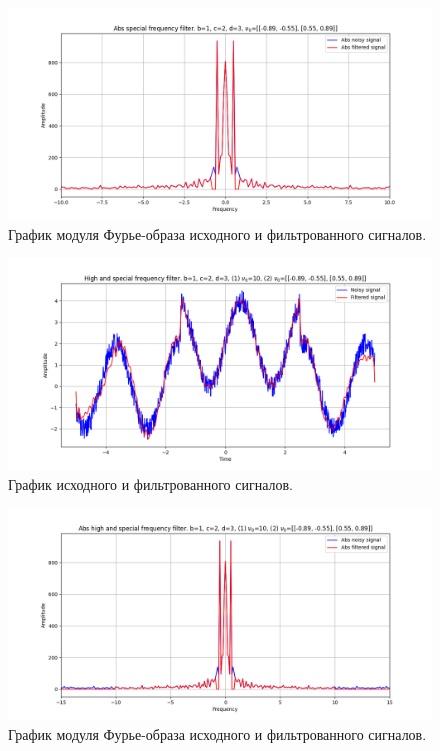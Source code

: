 \documentclass[a4paper, 12pt]{article}
\begin{document}
    \begin{figure}[!htb]
        \centering
        \includegraphics[scale=0.485]{6_1_abs_u_U_nospec.png}
        \captionsetup{skip=0pt}
        \caption{График модуля Фурье-образа исходного и фильтрованного сигналов.}
        \label{fig:fig102}
    \end{figure}
    \begin{figure}[!htb]
        \centering
        \includegraphics[scale=0.485]{6_2_u_flt_u_nospec.png}
        \captionsetup{skip=0pt}
        \caption{График исходного и фильтрованного сигналов.}
        \label{fig:fig103}
    \end{figure}
    \begin{figure}[!htb]
        \centering
        \includegraphics[scale=0.485]{6_2_abs_u_U_nospec.png}
        \captionsetup{skip=0pt}
        \caption{График модуля Фурье-образа исходного и фильтрованного сигналов.}
        \label{fig:fig104}
    \end{figure}
\end{document}
